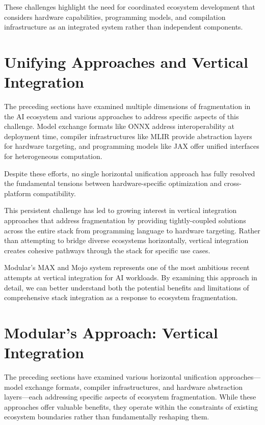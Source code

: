\documentclass[manuscript,screen,review,format=acmsmall]{acmart}
\begin{document}
These challenges highlight the need for coordinated ecosystem development that considers hardware capabilities, programming models, and compilation infrastructure as an integrated system rather than independent components.

\section{Unifying Approaches and Vertical Integration}

The preceding sections have examined multiple dimensions of fragmentation in the AI ecosystem and various approaches to address specific aspects of this challenge. Model exchange formats like ONNX address interoperability at deployment time, compiler infrastructures like MLIR provide abstraction layers for hardware targeting, and programming models like JAX offer unified interfaces for heterogeneous computation.

Despite these efforts, no single horizontal unification approach has fully resolved the fundamental tensions between hardware-specific optimization and cross-platform compatibility. 

This persistent challenge has led to growing interest in vertical integration approaches that address fragmentation by providing tightly-coupled solutions across the entire stack from programming language to hardware targeting. Rather than attempting to bridge diverse ecosystems horizontally, vertical integration creates cohesive pathways through the stack for specific use cases.

Modular's MAX and Mojo system represents one of the most ambitious recent attempts at vertical integration for AI workloads. By examining this approach in detail, we can better understand both the potential benefits and limitations of comprehensive stack integration as a response to ecosystem fragmentation.

\section{Modular's Approach: Vertical Integration} \label{sec:modular}

The preceding sections have examined various horizontal unification approaches—model exchange formats, compiler infrastructures, and hardware abstraction layers—each addressing specific aspects of ecosystem fragmentation. While these approaches offer valuable benefits, they operate within the constraints of existing ecosystem boundaries rather than fundamentally reshaping them.
\end{document}
